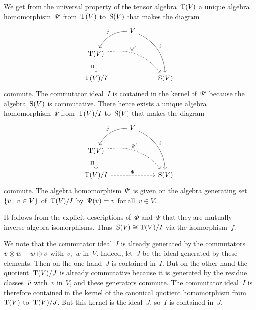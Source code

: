 \begin{recall}
\begin{description}
\begin{itemize}
          We get from the universal property of the tensor algebra~$\operatorname{T}(V)$ a unique algebra homomorphism~$\Psi'$ from~$\operatorname{T}(V)$ to~$\operatorname{S}(V)$ that makes the diagram
          \[
            \begin{tikzcd}
              {}
              &
              V
              \arrow[bend right]{dl}[above left]{j}
              \arrow[bend left]{ddr}[above right]{i}
              &
              {}
              \\
              \Tensor(V)
              \arrow[bend left, dashed]{drr}[above right, pos=0.35]{\Psi'}
              \arrow{d}[left]{\Pi}
              &
              {}
              &
              {}
              \\
              \Tensor(V)/I
              &
              {}
              &
              \Symm(V)
            \end{tikzcd}
          \]
          commute.
          The commutator ideal~$I$ is contained in the kernel of~$\Psi'$ because the algebra~$\operatorname{S}(V)$ is commutative.
          There hence exists a unique algebra homomorphism~$\Psi$ from~$\operatorname{T}(V)/I$ to~$\operatorname{S}(V)$ that makes the diagram
          \[
            \begin{tikzcd}
              {}
              &
              V
              \arrow[bend right]{dl}[above left]{j}
              \arrow[bend left]{ddr}[above right]{i}
              &
              {}
              \\
              \Tensor(V)
              \arrow[bend left, dashed]{drr}[above right, pos=0.37]{\Psi'}
              \arrow{d}[left]{\Pi}
              &
              {}
              &
              {}
              \\
              \Tensor(V)/I
              \arrow[dashed]{rr}[above]{\Psi}
              &
              {}
              &
              \Symm(V)
            \end{tikzcd}
          \]
          commute.
          The algebra homomorphism~$\Psi'$ is given on the algebra generating set~$\{ \class{v} \suchthat v \in V \}$ of~$\operatorname{T}(V) / I$ by~$\Psi(\overline{v}) = v$ for all~$v \in V$.
          
          It follows from the explicit descriptions of~$\Phi$ and~$\Psi$ that they are mutually inverse algebra isomorphisms.
          Thus~$\operatorname{S}(V) \cong \operatorname{T}(V)/I$ via the isomorphism~$f$.
          
          We note that the commutator ideal~$I$ is already generated by the commutators~$v \otimes w - w \otimes v$ with~$v$,~$w$ in~$V$.
          Indeed, let~$J$ be the ideal generated by these elements.
          Then on the one hand~$J$ is contained in~$I$.
          But on the other hand the quotient~$\operatorname{T}(V)/J$ is already commutative because it is generated by the residue classes~$\overline{v}$ with~$v$ in~$V$, and these generators commute.
          The commutator ideal~$I$ is therefore contained in the kernel of the canonical quotient homomorphism from~$\operatorname{T}(V)$ to~$\operatorname{T}(V)/J$.
          But this kernel is the ideal~$J$, so~$I$ is contained in~$J$.
          

\end{itemize}
\end{description}
\end{recall}
